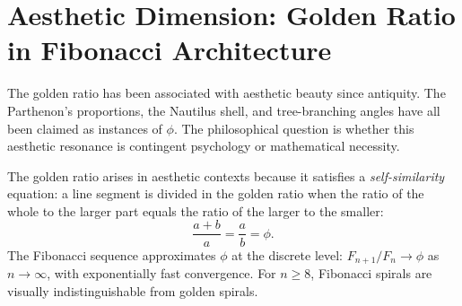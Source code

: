\begin{table}[H]
  \centering
  \caption{R14 Coq citation map for Chapter~31 (scarab-l31 additions).}
  \label{tab:coq-map-31-scarab}
\end{table}

\section{Aesthetic Dimension: Golden Ratio in Fibonacci Architecture}
\label{sec:phd31-aesthetics}

The golden ratio has been associated with aesthetic beauty since antiquity.
The Parthenon's proportions, the Nautilus shell, and tree-branching angles have
all been claimed as instances of \(\phi\).  The philosophical question is
whether this aesthetic resonance is contingent psychology or mathematical
necessity.

The golden ratio arises in aesthetic contexts because it satisfies a
\emph{self-similarity} equation: a line segment is divided in the golden ratio
when the ratio of the whole to the larger part equals the ratio of the larger
to the smaller:
\[
  \frac{a+b}{a} = \frac{a}{b} = \phi.
\]
The Fibonacci sequence approximates \(\phi\) at the discrete level:
\(F_{n+1}/F_n \to \phi\) as \(n \to \infty\), with exponentially fast
convergence.  For \(n \ge 8\), Fibonacci spirals are visually
indistinguishable from golden spirals.

